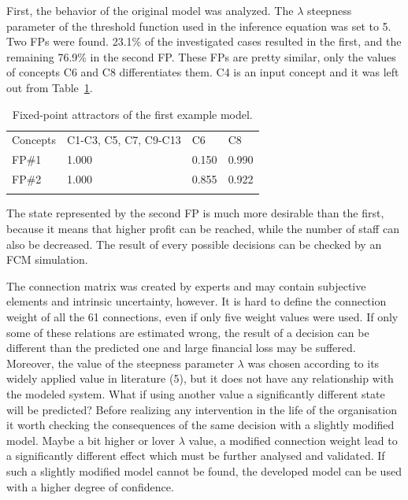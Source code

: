 \documentclass[graybox]{svmult}
\begin{document}
First, the behavior of the original model was analyzed. The $\lambda$ 
steepness parameter of the threshold function used in the inference 
equation was set to 5. Two FPs were found. 23.1\% of the investigated 
cases resulted in the first, and the remaining 76.9\% in the second 
FP. These FPs are pretty similar, only the values of concepts C6 and 
C8 differentiates them. C4 is an input concept and it was left out 
from Table~\ref{tab:OMFPs}. 

\begin{table}
\caption{Fixed-point attractors of the first example model.}
\label{tab:OMFPs}
\begin{center}
\begin{tabular}{llll}
\hline\noalign{\smallskip}
Concepts & C1-C3, C5, C7, C9-C13 & C6 & C8\\
\noalign{\smallskip}\svhline\noalign{\smallskip}
FP\#1 & 1.000 & 0.150 & 0.990\\
FP\#2 & 1.000 & 0.855 & 0.922\\
\noalign{\smallskip}\hline
\end{tabular}
\end{center}
\end{table}

The state represented by the second FP is much more desirable than the first, because it means that higher profit can be reached, while the number of staff can also be decreased. The result of every possible decisions can be checked by an FCM simulation.

The connection matrix was created by experts and may contain subjective elements and intrinsic uncertainty, however. It is hard to define the connection weight of all the 61 connections, even if only five weight values were used. If only some of these relations are estimated wrong, the result of a decision can be different than the predicted one and large financial loss may be suffered. Moreover, the value of the steepness parameter $\lambda$ was chosen according to its widely applied value in literature (5), but it does not have any relationship with the modeled system. What if using another value a significantly different state will be predicted? Before realizing any intervention in the life of the organisation it worth checking the consequences of the same decision with a slightly modified model. Maybe a bit higher or lover $\lambda$ value, a modified connection weight lead to a significantly different effect which must be further analysed and validated. If such a slightly modified model cannot be found, the developed model can be used with a higher degree of confidence.
\end{document}
